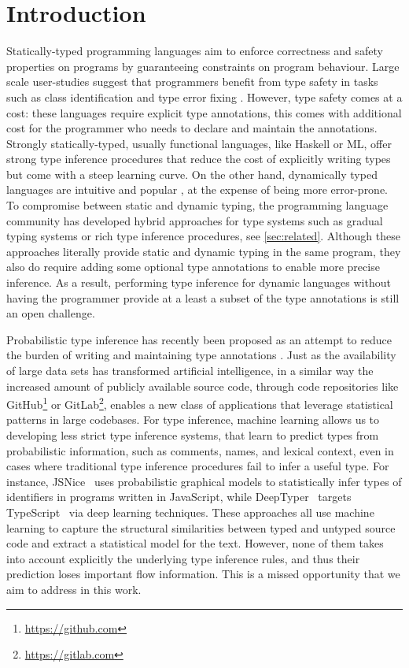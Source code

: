 \documentclass[sigplan,10pt,review,anonymous]{acmart}
\theoremstyle{plain}
\theoremstyle{remark}
\theoremstyle{definition}
\begin{document}
\section{Introduction}
Statically-typed programming languages aim to enforce correctness and safety  properties
on programs by guaranteeing constraints on program behaviour.
Large scale user-studies
suggest that programmers 
benefit from type safety in tasks 
such as class identification and type error fixing  \citep{hanenberg14}.
However, type safety comes at a cost: these languages require explicit type annotations,
this comes with additional cost  for the programmer who needs to declare and maintain the annotations. 
Strongly statically-typed, usually functional languages, like Haskell or ML, offer strong type inference procedures that reduce 
the cost of explicitly writing types but come with
a steep learning curve. 
On the other hand, dynamically typed languages are intuitive
and popular \cite{meyerovich12}, at the expense of being more error-prone. To compromise between static and dynamic typing, the programming language community has developed hybrid approaches for type systems such as gradual typing systems \cite{siek06} or rich type inference procedures, see \cref{sec:related}. 
Although these approaches literally provide static and dynamic typing in the same program, they also do require adding some optional type annotations to 
enable more precise inference. As a result, performing type inference for dynamic
languages without having the programmer provide at a least a subset of 
the type annotations is still an open challenge.

Probabilistic type inference
has recently been proposed as an attempt to reduce the burden
of writing and maintaining type
annotations \cite{raychev15,xu16,hellendoorn18}.
Just as the availability of large data sets has transformed artificial intelligence, 
in a similar way the increased amount of publicly available source code, through
code repositories like GitHub\footnote{\href{https://github.com}{https://github.com}}
or GitLab\footnote{\href{https://gitlab.com}{https://gitlab.com}}, 
enables a new class of applications that leverage statistical
patterns in large codebases.
For type inference, machine learning 
allows us to developing less strict type inference systems,
that learn to predict types from probabilistic information, 
such as comments, names, and lexical context,
even in cases where traditional type inference procedures
fail to infer a useful type. For instance,
JSNice~\cite{raychev15} uses probabilistic graphical models to statistically infer types of identifiers in programs written in JavaScript, while DeepTyper~\cite{hellendoorn18} targets TypeScript~\cite{typescript} via deep learning techniques.
These approaches all use machine learning to capture the structural
similarities between typed and untyped source code and extract a statistical model for
the text. However, none of them takes into account explicitly the underlying
type inference rules, and thus their prediction loses important flow information.
This is a missed opportunity that we aim to address in this work.
\end{document}
